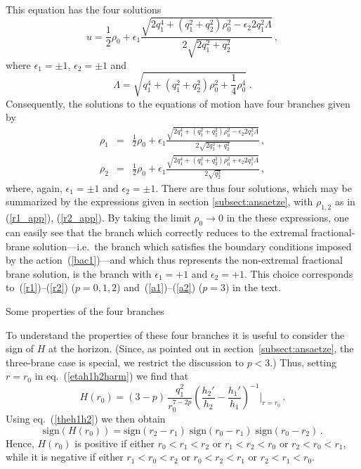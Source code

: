 \documentclass[a4paper,11pt]{article}
\makeatletter
\renewcommand{\subsection}{\@startsection{subsection}{2}{\z@} {-3.25ex
plus -1ex minus -.2ex}{1.5ex plus .2ex}{\normalsize\bf}}
\newcommand{\eqref}[1]{(\ref{#1})}
\makeatother
\begin{document}
%
This equation has the four solutions
%
\begin{equation}
u =\frac{1}{2} \rho_0 + \epsilon_1 \frac{\sqrt{2q_1^4 + (q_1^2 +
q_2^2)\rho_0^2 -\epsilon_2 2 q_1^2 \Lambda}}{2 \sqrt{2q_1^2+q_2^2}} \,,
\end{equation}
%
where $\epsilon_1 = \pm 1$, $\epsilon_2 = \pm 1$ and
%
\begin{equation}
\Lambda = \sqrt{q_1^4 + (q_1^2 +q_2^2)\rho_0^2 + \frac{1}{4}\rho_0^4}
\;.
\end{equation}
%
Consequently, the solutions to the equations of motion have four
branches given by
%
\begin{eqnarray}
\label{r1_app}
\rho_1 &=& \frac{1}{2} \rho_0 + \epsilon_1 \frac{\sqrt{2q_1^4 + (q_1^2
+ q_2^2)\rho_0^2 -\epsilon_2 2 q_1^2
\Lambda}}{2\sqrt{2q_1^2+q_2^2}}\,, \\[2ex]
%
\label{r2_app}
\rho_2 &=& \frac{1}{2} \rho_0 + \epsilon_1 \frac{\sqrt{2q_1^4 + (q_1^2
+ q_2^2)\rho_0^2 + \epsilon_2 2 q_1^2 \Lambda}}{2\sqrt{q_2^2}} \,,
\end{eqnarray}
%
where, again, $\epsilon_1 = \pm 1$ and $\epsilon_2 = \pm 1$.  There
are thus four solutions, which may be summarized by the expressions
given  in section \ref{subsect:ansaetze}, with $\rho_{1,2}$ as in
\eqref{r1_app}, \eqref{r2_app}. By taking the limit $\rho_0
\rightarrow 0$ in the these expressions, one can easily see that the
branch which correctly reduces to the extremal fractional-brane
solution---i.e.\ the branch which satisfies the boundary conditions
imposed by the action~\eqref{bac1}---and which thus represents the
non-extremal fractional brane solution, is the branch with $\epsilon_1
=+1$ and $\epsilon_2 =+1$. This choice corresponds
to~\eqref{r1}--\eqref{r2} ($p=0,1,2$) and~\eqref{a1}--\eqref{a2} 
($p=3$) in the text.

\subsection{Some properties of the four branches}
\label{subsect:iquattrorami}

To understand the properties of these four branches it is useful to
consider the sign of $H$ at the horizon. (Since, as pointed out in
section~\ref{subsect:ansaetze}, the three-brane case is special, we
restrict the discussion to $p<3$.) Thus, setting $r=r_0$ in
eq.~\eqref{etah1h2harm} we find that
%
\begin{equation}
H(r_0) = (3-p)\,\frac{q_1^2}{r_0^{7-2p}} \left( \frac{h_2'}{h_2} -
\frac{h_1'}{h_1} \right)^{-1} \Bigg\vert_{r=r_0} \,.
\end{equation}
%
Using eq.~\eqref{theh1h2} we then obtain
%
\begin{equation}
\label{signH} \mathrm{sign} (H(r_0)) = \mathrm{sign}(r_2-r_1) \;
\mathrm{sign}(r_0-r_1) \; \mathrm{sign}(r_0-r_2) \,.
\end{equation}
%
Hence, $H(r_0)$ is positive if either $r_0 < r_1 < r_2$ or $r_1 < r_2
< r_0$ or $r_2 < r_0 < r_1$, while it is negative if either $r_1 < r_0
< r_2$ or $r_0 < r_2 < r_1$ or $r_2 < r_1 < r_0$.
\end{document}
